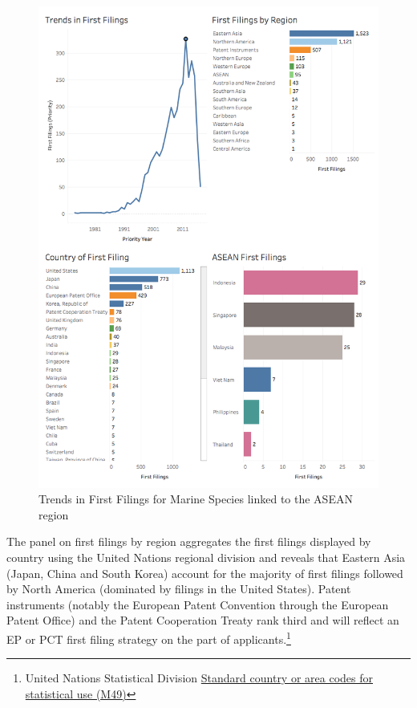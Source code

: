 \documentclass[]{book}
\theoremstyle{definition}
\theoremstyle{definition}
\theoremstyle{definition}
\theoremstyle{remark}
\begin{document}
\begin{figure}

{\centering \includegraphics[width=1\linewidth]{images-patents/first_filings} 

}

\caption{Trends in First Filings for Marine Species linked to the ASEAN region}\label{fig:firstfilings}
\end{figure}

The panel on first filings by region aggregates the first filings
displayed by country using the United Nations regional division and
reveals that Eastern Asia (Japan, China and South Korea) account for the
majority of first filings followed by North America (dominated by
filings in the United States). Patent instruments (notably the European
Patent Convention through the European Patent Office) and the Patent
Cooperation Treaty rank third and will reflect an EP or PCT first filing
strategy on the part of applicants.\footnote{United Nations Statistical
  Division \href{https://unstats.un.org/unsd/methodology/m49/}{Standard
  country or area codes for statistical use (M49)}}
\end{document}
